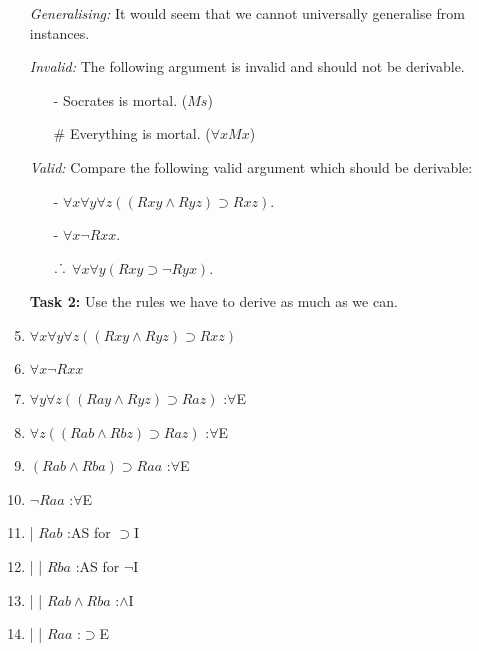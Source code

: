 \documentclass[a4paper, 11pt]{article} %
\def\therefore{\ensuremath{\ldotp\dot\,\ldotp}}
\begin{document}
\begin{enumerate}
  \item[\it Generalising:] It would seem that we cannot universally generalise from instances.
  \item[\it Invalid:] The following argument is invalid and should not be derivable. 
    \begin{itemize}
      \item[-] Socrates is mortal. \quad ($Ms$)
      \item[$\#$] Everything is mortal. \quad ($\forall xMx$)
    \end{itemize}
  \item[\it Valid:] Compare the following valid argument which should be derivable:
    \begin{itemize}
      \item[-] $\forall x\forall y\forall z((Rxy \wedge Ryz) \supset Rxz)$.
      \item[-] $\forall x\neg Rxx$.
      \item[$\therefore$] $\forall x\forall y(Rxy \supset \neg Ryx)$.
    \end{itemize}
  \item[\bf Task 2:] Use the rules we have to derive as much as we can.  
    \item $\forall x\forall y\forall z((Rxy \wedge Ryz) \supset Rxz)$
    \item \underline{$\forall x\neg Rxx$}
    \item $\forall y\forall z((Ray \wedge Ryz) \supset Raz)$ \hfill :$\forall$E \hspace{2.35in}\strut
    \item $\forall z((Rab \wedge Rbz) \supset Raz)$ \hfill :$\forall$E \hspace{2.35in}\strut 
    \item $(Rab \wedge Rba) \supset Raa$ \hfill :$\forall$E \hspace{2.35in}\strut
    \item $\neg Raa$ \hfill \hfill :$\forall$E  \hspace{2.35in}\strut
    \item | $Rab$ \hfill \hfill :AS for $\supset$I \hspace{2.35in}\strut
    \item | | $Rba$ \hfill :AS for $\neg$I \hspace{2.35in}\strut
    \item | | $Rab \wedge Rba$ \hfill :$\wedge$I \hspace{2.35in}\strut
    \item | | $Raa$ \hfill :$\supset$E \hspace{2.35in}\strut

\end{enumerate}
\end{document}
